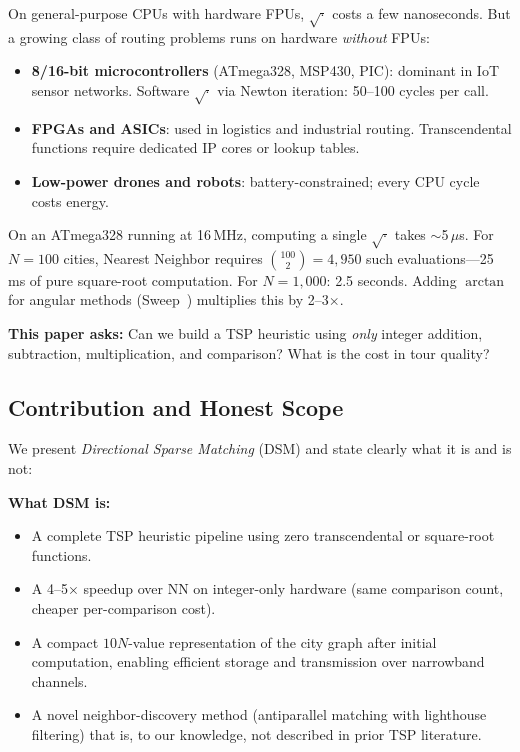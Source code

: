 \documentclass[11pt,a4paper,twocolumn]{article}
\begin{document}
On general-purpose CPUs with hardware FPUs, $\sqrt{\cdot}$ costs a few nanoseconds. But a growing class of routing problems runs on hardware \textit{without} FPUs:
\begin{itemize}[leftmargin=*,itemsep=1pt]
\item \textbf{8/16-bit microcontrollers} (ATmega328, MSP430, PIC): dominant in IoT sensor networks. Software $\sqrt{\cdot}$ via Newton iteration: 50--100 cycles per call.
\item \textbf{FPGAs and ASICs}: used in logistics and industrial routing. Transcendental functions require dedicated IP cores or lookup tables.
\item \textbf{Low-power drones and robots}: battery-constrained; every CPU cycle costs energy.
\end{itemize}

On an ATmega328 running at 16\,MHz, computing a single $\sqrt{\cdot}$ takes $\sim$5\,$\mu$s. For $N{=}100$ cities, Nearest Neighbor requires $\binom{100}{2}{=}4{,}950$ such evaluations---25\,ms of pure square-root computation. For $N{=}1{,}000$: 2.5 seconds. Adding $\arctan$ for angular methods (Sweep~\cite{gillett1974}) multiplies this by 2--3$\times$.

\textbf{This paper asks:} Can we build a TSP heuristic using \textit{only} integer addition, subtraction, multiplication, and comparison? What is the cost in tour quality?

\subsection{Contribution and Honest Scope}

We present \textit{Directional Sparse Matching} (DSM) and state clearly what it is and is not:

\textbf{What DSM is:}
\begin{itemize}[leftmargin=*,itemsep=1pt]
\item A complete TSP heuristic pipeline using zero transcendental or square-root functions.
\item A 4--5$\times$ speedup over NN on integer-only hardware (same comparison count, cheaper per-comparison cost).
\item A compact $10N$-value representation of the city graph after initial computation, enabling efficient storage and transmission over narrowband channels.
\item A novel neighbor-discovery method (antiparallel matching with lighthouse filtering) that is, to our knowledge, not described in prior TSP literature.
\end{itemize}
\end{document}
